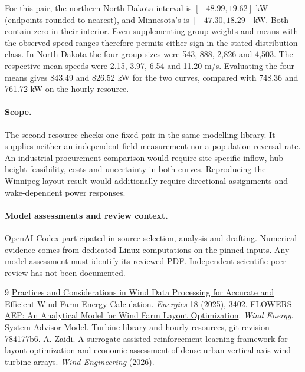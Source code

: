 \documentclass[11pt]{article}
\begin{document}
For this pair, the northern North Dakota interval is $[-48.99,19.62]$ kW (endpoints rounded to nearest), and Minnesota's is $[-47.30,18.29]$ kW. Both contain zero in their interior. Even supplementing group weights and means with the observed speed ranges therefore permits either sign in the stated distribution class. In North Dakota the four group sizes were 543, 888, 2,826 and 4,503. The respective mean speeds were 2.15, 3.97, 6.54 and 11.20 m/s. Evaluating the four means gives 843.49 and 826.52 kW for the two curves, compared with 748.36 and 761.72 kW on the hourly resource.

\paragraph{Scope.} The second resource checks one fixed pair in the same modelling library. It supplies neither an independent field measurement nor a population reversal rate. An industrial procurement comparison would require site-specific inflow, hub-height feasibility, costs and uncertainty in both curves. Reproducing the Winnipeg layout result would additionally require directional assignments and wake-dependent power responses.

\paragraph{Model assessments and review context.} OpenAI Codex participated in source selection, analysis and drafting. Numerical evidence comes from dedicated Linux computations on the pinned inputs. Any model assessment must identify its reviewed PDF. Independent scientific peer review has not been documented.

{\small\begin{thebibliography}{9}\setlength{\itemsep}{0pt}
\href{https://doi.org/10.3390/en18133402}{Practices and Considerations in Wind Data Processing for Accurate and Efficient Wind Farm Energy Calculation}. \emph{Energies} 18 (2025), 3402.
\href{https://doi.org/10.1002/we.2954}{FLOWERS AEP: An Analytical Model for Wind Farm Layout Optimization}. \emph{Wind Energy}.
System Advisor Model. \href{https://github.com/NatLabRockies/SAM/tree/784177b634fa1475fda6672b70595e087a238aea/deploy}{Turbine library and hourly resources}, git revision 784177b6.
A. Zaidi. \href{https://doi.org/10.1177/0309524X261506803}{A surrogate-assisted reinforcement learning framework for layout optimization and economic assessment of dense urban vertical-axis wind turbine arrays}. \emph{Wind Engineering} (2026).
\end{thebibliography}}
\end{document}
